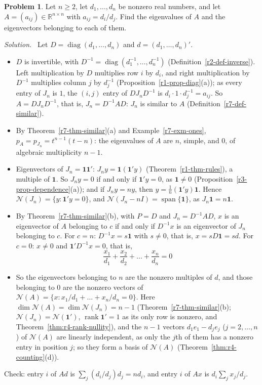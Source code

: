 \documentclass[12pt]{article}
\newcommand{\R}{\mathbb R}
\newcommand{\one}{\mathbf 1}
\DeclareMathOperator{\diag}{diag}
\DeclareMathOperator{\rank}{rank}
\DeclareMathOperator{\Span}{span}
\theoremstyle{definition}
\newtheorem{problem}{Problem}
\newenvironment{solution}{\par\noindent\textit{Solution.}\ }{\par\smallskip}
\begin{document}
\begin{problem}\label{r7-ex-pr-ratio-matrix}
Let \(n\geqslant2\), let \(d_1,\dots,d_n\) be nonzero real numbers, and let \(A=(a_{ij})\in\R^{n\times n}\) with
\(a_{ij}=d_i/d_j\). Find the eigenvalues of \(A\) and the eigenvectors belonging to each of them.
\end{problem}
\begin{solution}
Let \(D=\diag(d_1,\dots,d_n)\) and \(d=(d_1,\dots,d_n)'\).
\begin{itemize}
\item \(D\) is invertible, with \(D^{-1}=\diag(d_1^{-1},\dots,d_n^{-1})\) (Definition~\ref{r2-def-inverse}). Left
multiplication by \(D\) multiplies row \(i\) by \(d_i\), and right multiplication by \(D^{-1}\) multiplies column \(j\) by
\(d_j^{-1}\) (Proposition~\ref{r1-prop-diag}(a)); as every entry of \(J_n\) is \(1\),
the \((i,j)\) entry of \(DJ_nD^{-1}\) is \(d_i\cdot1\cdot d_j^{-1}=a_{ij}\). So \(A=DJ_nD^{-1}\), that is,
\(J_n=D^{-1}AD\): \(J_n\) is similar to \(A\) (Definition~\ref{r7-def-similar}).
\item By Theorem~\ref{r7-thm-similar}(a) and Example~\ref{r7-exm-ones}, \(p_A=p_{J_n}=t^{n-1}(t-n)\): the eigenvalues of
\(A\) are \(n\), simple, and \(0\), of algebraic multiplicity \(n-1\).
\item Eigenvectors of \(J_n=\one\one'\): \(J_ny=\one(\one'y)\) (Theorem~\ref{r1-thm-rules}), a multiple of \(\one\). So
\(J_ny=0\) if and only if \(\one'y=0\), as \(\one\ne0\) (Proposition~\ref{r3-prop-dependence}(a)); and if \(J_ny=ny\),
then \(y=\frac1n(\one'y)\one\). Hence
\(\mathcal N(J_n)=\{y:\one'y=0\}\), and \(\mathcal N(J_n-nI)=\Span\{\one\}\), as \(J_n\one=n\one\).
\item By Theorem~\ref{r7-thm-similar}(b), with \(P=D\) and \(J_n=D^{-1}AD\), \(x\) is an eigenvector of \(A\) belonging
to \(c\) if and only if \(D^{-1}x\) is an eigenvector of \(J_n\) belonging to \(c\). For \(c=n\): \(D^{-1}x=s\one\) with
\(s\ne0\), that is, \(x=sD\one=sd\). For \(c=0\): \(x\ne0\) and \(\one'D^{-1}x=0\), that is,
\[
\frac{x_1}{d_1}+\frac{x_2}{d_2}+\dots+\frac{x_n}{d_n}=0
\]
\item So the eigenvectors belonging to \(n\) are the nonzero multiples of \(d\), and those belonging to \(0\) are the
nonzero vectors of \(\mathcal N(A)=\{x:x_1/d_1+\dots+x_n/d_n=0\}\). Here \(\dim\mathcal N(A)=\dim\mathcal N(J_n)=n-1\)
(Theorem~\ref{r7-thm-similar}(b); \(\mathcal N(J_n)=\mathcal N(\one')\), \(\rank\one'=1\) as its only row is nonzero, and
Theorem~\ref{thm:r4-rank-nullity}), and the
\(n-1\) vectors \(d_1e_1-d_je_j\) (\(j=2,\dots,n\)) of \(\mathcal N(A)\) are linearly independent, as only the \(j\)th of
them has a nonzero entry in position \(j\); so they form a basis of \(\mathcal N(A)\)
(Theorem~\ref{thm:r4-counting}(d)).
\end{itemize}
Check: entry \(i\) of \(Ad\) is \(\sum_j(d_i/d_j)d_j=nd_i\), and entry \(i\) of \(Ax\) is \(d_i\sum_jx_j/d_j\).
\end{solution}
\end{document}
